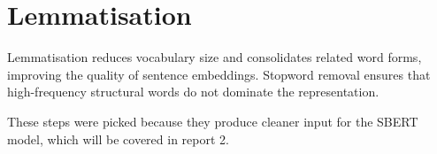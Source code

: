 \documentclass[11pt]{article}
\begin{document}
\section{Lemmatisation}

Lemmatisation reduces vocabulary size and consolidates related word forms, improving the quality of sentence embeddings. Stopword removal ensures that high-frequency structural words do not dominate the representation. 

These steps were picked because they produce cleaner input for the SBERT model, which will be covered in report 2.





\end{document}
